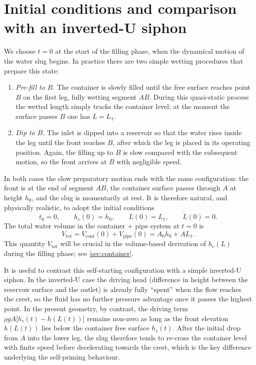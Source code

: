 \documentclass[11pt]{article}
\begin{document}
\section{Initial conditions and comparison with an inverted-U siphon}

We choose $t = 0$ at the start of the filling phase, when the dynamical motion of the
water slug begins. In practice there are two simple wetting procedures that prepare this
state:
\begin{enumerate}
  \item \emph{Pre-fill to $B$.} The container is slowly filled until the free surface reaches
        point $B$ on the first leg, fully wetting segment $AB$. During this quasi-static
        process the wetted length simply tracks the container level; at the moment the
        surface passes $B$ one has $L=L_1$.
  \item \emph{Dip to $B$.} The inlet is dipped into a reservoir so that the water rises inside
        the leg until the front reaches $B$, after which the leg is placed in its operating
        position. Again, the filling up to $B$ is slow compared with the subsequent motion,
        so the front arrives at $B$ with negligible speed.
\end{enumerate}
In both cases the slow preparatory motion ends with the same configuration: the front is
at the end of segment $AB$, the container surface passes through $A$ at height $h_0$, and
the slug is momentarily at rest. It is therefore natural, and physically realistic, to adopt
the initial conditions
\begin{equation}
  t_0 = 0,\qquad h_c(0)=h_0,\qquad L(0) = L_1,\qquad \dot L(0) = 0.
  \label{eq:IC}
\end{equation}
The total water volume in the container + pipe system at $t = 0$ is
\[
  V_{\text{tot}}
  = V_{\text{cont}}(0) + V_{\text{pipe}}(0)
  = A_0 h_0 + A L_1.
\]
This quantity $V_{\text{tot}}$ will be crucial in the volume-based derivation of $h_c(L)$ during
the filling phase; see \cref{sec:container}.

It is useful to contrast this self-starting configuration with a simple inverted-U siphon.
In the inverted-U case the driving head (difference in height between the reservoir surface
and the outlet) is already fully ``spent'' when the flow reaches the crest, so the fluid has
no further pressure advantage once it passes the highest point. In the present geometry,
by contrast, the driving term $\rho g A\bigl[h_c(t)-h(L(t))\bigr]$ remains non-zero as long
as the front elevation $h(L(t))$ lies below the container free surface $h_c(t)$. After the
initial drop from $A$ into the lower leg, the slug therefore tends to re-cross the container
level with finite speed before decelerating towards the crest, which is the key difference
underlying the self-priming behaviour.
\end{document}
